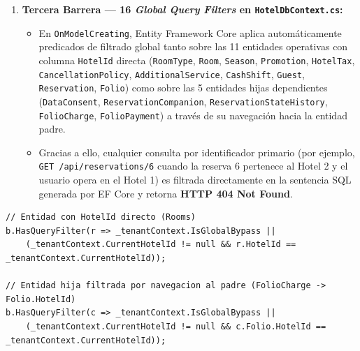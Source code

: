 \documentclass[12pt,a4paper]{article}
\begin{document}
\begin{enumerate}
    \item \textbf{Tercera Barrera --- 16 \textit{Global Query Filters} en \texttt{HotelDbContext.cs}:}
    \begin{itemize}
        \item En \texttt{OnModelCreating}, Entity Framework Core aplica autom\'aticamente predicados de filtrado global \cite{efcore_queryfilters} tanto sobre las 11 entidades operativas con columna \texttt{HotelId} directa (\texttt{RoomType}, \texttt{Room}, \texttt{Season}, \texttt{Promotion}, \texttt{HotelTax}, \texttt{CancellationPolicy}, \texttt{AdditionalService}, \texttt{CashShift}, \texttt{Guest}, \texttt{Reservation}, \texttt{Folio}) como sobre las 5 entidades hijas dependientes (\texttt{DataConsent}, \texttt{ReservationCompanion}, \texttt{ReservationStateHistory}, \texttt{FolioCharge}, \texttt{FolioPayment}) a trav\'es de su navegaci\'on hacia la entidad padre.
        \item Gracias a ello, cualquier consulta por identificador primario (por ejemplo, \texttt{GET /api/reservations/6} cuando la reserva 6 pertenece al Hotel 2 y el usuario opera en el Hotel 1) es filtrada directamente en la sentencia SQL generada por EF Core y retorna \textbf{HTTP 404 Not Found}.
    \end{itemize}
\end{enumerate}

\begin{lstlisting}[language={[Sharp]C},caption={Extracto real de Global Query Filters Multi-Tenant en \texttt{HotelDbContext.cs}}]
// Entidad con HotelId directo (Rooms)
b.HasQueryFilter(r => _tenantContext.IsGlobalBypass ||
    (_tenantContext.CurrentHotelId != null && r.HotelId == _tenantContext.CurrentHotelId));

// Entidad hija filtrada por navegacion al padre (FolioCharge -> Folio.HotelId)
b.HasQueryFilter(c => _tenantContext.IsGlobalBypass ||
    (_tenantContext.CurrentHotelId != null && c.Folio.HotelId == _tenantContext.CurrentHotelId));
\end{lstlisting}
\end{document}
